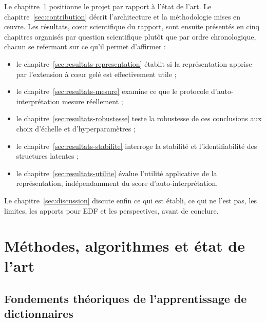 \documentclass[11pt]{article}
\begin{document}
Le chapitre~\ref{sec:etat-art} positionne le projet par rapport à l'état de
l'art. Le chapitre~\ref{sec:contribution} décrit l'architecture et la
méthodologie mises en œuvre. Les résultats, cœur scientifique du rapport,
sont ensuite présentés en cinq chapitres organisés par question scientifique
plutôt que par ordre chronologique, chacun se refermant sur ce qu'il permet
d'affirmer :
\begin{itemize}
  \item le chapitre~\ref{sec:resultats-representation} établit si la
  représentation apprise par l'extension à cœur gelé est effectivement utile ;
  \item le chapitre~\ref{sec:resultats-mesure} examine ce que le protocole
  d'auto-interprétation mesure réellement ;
  \item le chapitre~\ref{sec:resultats-robustesse} teste la robustesse de ces
  conclusions aux choix d'échelle et d'hyperparamètres ;
  \item le chapitre~\ref{sec:resultats-stabilite} interroge la stabilité et
  l'identifiabilité des structures latentes ;
  \item le chapitre~\ref{sec:resultats-utilite} évalue l'utilité applicative
  de la représentation, indépendamment du score d'auto-interprétation.
\end{itemize}
Le chapitre~\ref{sec:discussion} discute enfin ce qui est établi, ce qui ne
l'est pas, les limites, les apports pour EDF et les perspectives, avant de
conclure.

\newpage
\section{Méthodes, algorithmes et état de l'art}
\label{sec:etat-art}

\subsection{Fondements théoriques de l'apprentissage de dictionnaires}
\end{document}
